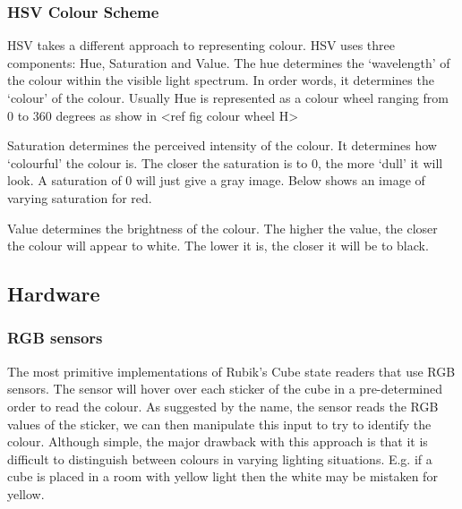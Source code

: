 \documentclass[titlepage]{report}[12pt]
\begin{document}
\subsubsection{HSV Colour Scheme}
HSV takes a different approach to representing colour. HSV uses three components: Hue, Saturation and Value. The hue determines the `wavelength' of the colour within the visible light spectrum. In order words, it determines the `colour' of the colour. Usually Hue is represented as a colour wheel ranging from 0 to 360 degrees as show in <ref fig colour wheel H>

Saturation determines the perceived intensity of the colour. It determines how `colourful' the colour is. The closer the saturation is to 0, the more `dull' it will look. A saturation of 0 will just give a gray image. Below shows an image of varying saturation for red. %
	
Value determines the brightness of the colour. The higher the value, the closer the colour will appear to white. The lower it is, the closer it will be to black.
\subsection{Hardware}
\subsubsection{RGB sensors}
The most primitive implementations of Rubik's Cube state readers that use RGB sensors. The sensor will hover over each sticker of the cube in a pre-determined order to read the colour. As suggested by the name, the sensor reads the RGB values of the sticker, we can then manipulate this input to try to identify the colour.
Although simple, the major drawback with this approach is that it is difficult to distinguish between colours in varying lighting situations. E.g. if a cube is placed in a room with yellow light then the white may be mistaken for yellow.
\end{document}
